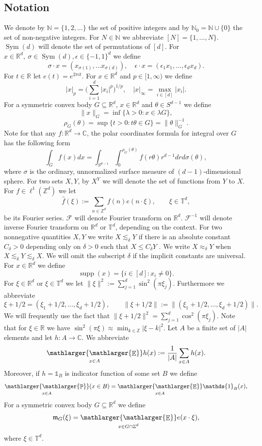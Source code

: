\documentclass[a4paper,oneside, reqno]{amsart}
\numberwithin{equation}{section}
\theoremstyle{definition}%
\theoremstyle{definition}
\theoremstyle{definition}%
\theoremstyle{definition}
\newcommand{\E}{\mathop{\mathbb{E}}}
\newcommand{\Pro}{\mathop{\mathbb{P}}}
\newcommand{\Z}{\mathbb{Z}}
\newcommand{\R}{\mathbb{R}}
\newcommand{\C}{\mathbb{C}}
\newcommand{\N}{\mathbb{N}}
\newcommand{\T}{\mathbb{T}}
\DeclareMathOperator{\Sym}{Sym}
\DeclareMathOperator{\supp}{supp}
\newcommand{\se}[1]{\underset{_{\substack{#1}}}{\mathlarger{\mathlarger{\E}}}}
\newcommand{\spr}[1]{\underset{_{\substack{#1}}}{\mathlarger{\mathlarger{\Pro}}}}
\begin{document}
\subsection{Notation}
 We denote by $\N= \{1,2,... \}$ the set of positive integers and by $\N_0=\N \cup \{ 0\}$ the set of non-negative integers.
 For $N\in \N$ we abbreviate $[N]=\{1,\dots,N\}.$
$\Sym(d)$ will denote the set of permutations of $[d]$. For $x \in \R^d, \ \sigma \in \Sym(d), \epsilon \in \{-1,1\}^d$ we define 
\[
\sigma \cdot x= (x_{\sigma(1)}, \ldots x_{\sigma(d)}), \quad \epsilon \cdot x= (\epsilon_1 x_1, \ldots, \epsilon_d x_d).
\]
For $t \in \R$ let $e(t)=e^{2\pi i t}$.
For $x \in \R^d$ and $p \in [1,\infty)$ we define
\[
|x|_p= \Big(\sum_{i=1}^d |x_i|^p \Big)^{1/p}, \quad |x|_{\infty}=\max_{i \in [d]} |x_i|.
\]
 For a symmetric convex body $G \subseteq \R^d$, $x \in \R^d$ and $\theta \in S^{d-1}$ we define 
\[
\| x\|_G= \inf\Big\{ \lambda>0 : x \in \lambda G \Big\},
\]
\[
\rho_G(\theta)= \sup\Big\{t>0: t \theta \in G \Big\}=\|\theta\|_G^{-1}.
\]
Note for that any $f: \R^d \to \C$, the polar coordinates formula for integral over $G$ has the following form
\[
\int_{G} f(x) dx= \int_{S^{d-1}} \int_0^{\rho_G(\theta)} f(r \theta) r^{d-1} dr d\sigma(\theta),
\]
where $\sigma$ is the ordinary, unnormalized surface measure of $(d-1)$-dimensional sphere.
 For two sets $X,Y$, by $X^Y$ we will denote the set of functions from $Y$ to $X$.
 For $f\in \ell^1(\Z^d)$ we let 
\begin{equation*}
 \hat{f}(\xi) := \sum_{n\in\Z^d} f(n) e(n\cdot \xi),\qquad \xi\in\T^d,
\end{equation*}
be its Fourier series. $\mathcal{F}$ will denote Fourier transform on $\R^d$. $\mathcal{F}^{-1}$ will denote inverse Fourier transform on $\R^d$ or $\T^d$, depending on the context. 
 For two nonnegative quantities $X, Y$
we write $X \lesssim_{\delta} Y$ if there is an absolute constant
$C_{\delta}>0$ depending only on $\delta>0$ such that $X\le C_{\delta}Y$ .
We  write $X \approx_{\delta} Y$ when
$X \lesssim_{\delta} Y\lesssim_{\delta} X$. We will omit the subscript
$\delta$ if the implicit constants are universal.
For $x \in \mathbb{R}^d$ we define
\[
\supp(x)=\{i \in [d]: x_i \neq 0\}.
\]
For $\xi\in \R^d$ or $\xi \in \T^d$ we let $\| \xi \|^2:=\sum_{j=1}^d \sin^2(\pi \xi_j).$ Furthermore we abbreviate \[\xi+1/2=(\xi_1+1/2,\ldots,\xi_d+1/2),\qquad \|\xi +1/2 \|:=\|(\xi_1+1/2,\ldots,\xi_d+1/2)\|.\] We will frequently use the fact that
$\|\xi +1/2 \|^2= \sum_{j=1}^d \cos^2(\pi \xi_j)$. Note that for $\xi \in \R$ we have $\sin^2(\pi \xi) \approx \min_{k \in \Z} |\xi-k|^2$.
 Let $A$ be a finite set of $|A|$ elements and let $h\colon A\to \mathbb{C}.$ We abbreviate \[\se{x \in A}h(x):=\frac{1}{|A|}\sum_{x\in A} h(x).\]
 Moreover, if $h=\mathds{1}_B$ is indicator function of some set $B$ we define
 \[
 \spr{x \in A}(x \in B)= \se{x \in A}\mathds{1}_B(x),
 \]
 For a symmetric convex body $G \subseteq \R^d$ we define
\[
\mathfrak{m}_G(\xi)= \se{x \in G \cap \Z^d} e(x \cdot \xi),
\]
where $\xi \in \T^d$.
\end{document}
